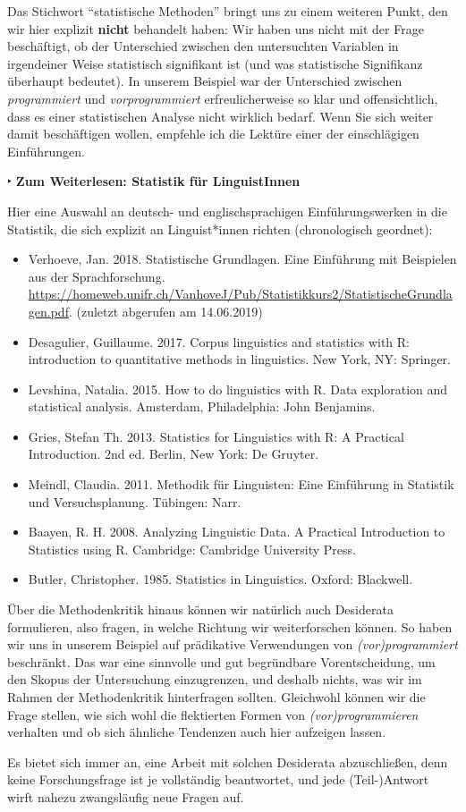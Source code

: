 \documentclass[]{article}
\begin{document}
Das Stichwort \enquote{statistische Methoden} bringt uns zu einem
weiteren Punkt, den wir hier explizit \textbf{nicht} behandelt haben:
Wir haben uns nicht mit der Frage beschäftigt, ob der Unterschied
zwischen den untersuchten Variablen in irgendeiner Weise statistisch
signifikant ist (und was statistische Signifikanz überhaupt bedeutet).
In unserem Beispiel war der Unterschied zwischen \emph{programmiert} und
\emph{vorprogrammiert} erfreulicherweise so klar und offensichtlich,
dass es einer statistischen Analyse nicht wirklich bedarf. Wenn Sie sich
weiter damit beschäftigen wollen, empfehle ich die Lektüre einer der
einschlägigen Einführungen.

 ‣ \textbf{Zum Weiterlesen: Statistik für LinguistInnen}

Hier eine Auswahl an deutsch- und englischsprachigen Einführungswerken
in die Statistik, die sich explizit an Linguist*innen richten
(chronologisch geordnet):

\begin{itemize}
\item
  Verhoeve, Jan. 2018. Statistische Grundlagen. Eine Einführung mit
  Beispielen aus der Sprachforschung.
  \url{https://homeweb.unifr.ch/VanhoveJ/Pub/Statistikkurs2/StatistischeGrundlagen.pdf}.
  (zuletzt abgerufen am 14.06.2019)
\item
  Desagulier, Guillaume. 2017. Corpus linguistics and statistics with R:
  introduction to quantitative methods in linguistics. New York, NY:
  Springer.
\item
  Levshina, Natalia. 2015. How to do linguistics with R. Data
  exploration and statistical analysis. Amsterdam, Philadelphia: John
  Benjamins.
\item
  Gries, Stefan Th. 2013. Statistics for Linguistics with R: A Practical
  Introduction. 2nd ed. Berlin, New York: De Gruyter.
\item
  Meindl, Claudia. 2011. Methodik für Linguisten: Eine Einführung in
  Statistik und Versuchsplanung. Tübingen: Narr.
\item
  Baayen, R. H. 2008. Analyzing Linguistic Data. A Practical
  Introduction to Statistics using R. Cambridge: Cambridge University
  Press.
\item
  Butler, Christopher. 1985. Statistics in Linguistics. Oxford:
  Blackwell.
\end{itemize}

Über die Methodenkritik hinaus können wir natürlich auch Desiderata
formulieren, also fragen, in welche Richtung wir weiterforschen können.
So haben wir uns in unserem Beispiel auf prädikative Verwendungen von
\emph{(vor)programmiert} beschränkt. Das war eine sinnvolle und gut
begründbare Vorentscheidung, um den Skopus der Untersuchung
einzugrenzen, und deshalb nichts, was wir im Rahmen der Methodenkritik
hinterfragen sollten. Gleichwohl können wir die Frage stellen, wie sich
wohl die flektierten Formen von \emph{(vor)programmieren} verhalten und
ob sich ähnliche Tendenzen auch hier aufzeigen lassen.

Es bietet sich immer an, eine Arbeit mit solchen Desiderata
abzuschließen, denn keine Forschungsfrage ist je vollständig
beantwortet, und jede (Teil-)Antwort wirft nahezu zwangsläufig neue
Fragen auf.
\end{document}
